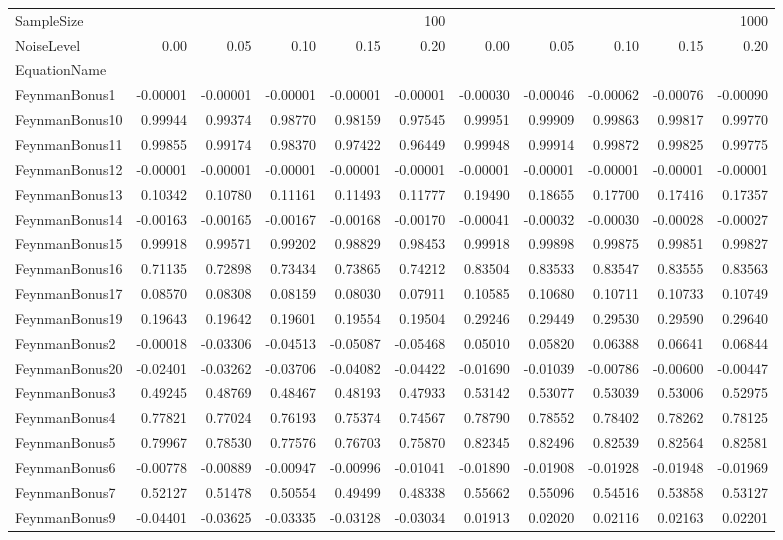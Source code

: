 \begin{tabular}{lrrrrrrrrrr}
\toprule
SampleSize & \multicolumn{5}{r}{100} & \multicolumn{5}{r}{1000} \\
NoiseLevel & 0.00 & 0.05 & 0.10 & 0.15 & 0.20 & 0.00 & 0.05 & 0.10 & 0.15 & 0.20 \\
EquationName &  &  &  &  &  &  &  &  &  &  \\
\midrule
FeynmanBonus1 & -0.00001 & -0.00001 & -0.00001 & -0.00001 & -0.00001 & -0.00030 & -0.00046 & -0.00062 & -0.00076 & -0.00090 \\
FeynmanBonus10 & 0.99944 & 0.99374 & 0.98770 & 0.98159 & 0.97545 & 0.99951 & 0.99909 & 0.99863 & 0.99817 & 0.99770 \\
FeynmanBonus11 & 0.99855 & 0.99174 & 0.98370 & 0.97422 & 0.96449 & 0.99948 & 0.99914 & 0.99872 & 0.99825 & 0.99775 \\
FeynmanBonus12 & -0.00001 & -0.00001 & -0.00001 & -0.00001 & -0.00001 & -0.00001 & -0.00001 & -0.00001 & -0.00001 & -0.00001 \\
FeynmanBonus13 & 0.10342 & 0.10780 & 0.11161 & 0.11493 & 0.11777 & 0.19490 & 0.18655 & 0.17700 & 0.17416 & 0.17357 \\
FeynmanBonus14 & -0.00163 & -0.00165 & -0.00167 & -0.00168 & -0.00170 & -0.00041 & -0.00032 & -0.00030 & -0.00028 & -0.00027 \\
FeynmanBonus15 & 0.99918 & 0.99571 & 0.99202 & 0.98829 & 0.98453 & 0.99918 & 0.99898 & 0.99875 & 0.99851 & 0.99827 \\
FeynmanBonus16 & 0.71135 & 0.72898 & 0.73434 & 0.73865 & 0.74212 & 0.83504 & 0.83533 & 0.83547 & 0.83555 & 0.83563 \\
FeynmanBonus17 & 0.08570 & 0.08308 & 0.08159 & 0.08030 & 0.07911 & 0.10585 & 0.10680 & 0.10711 & 0.10733 & 0.10749 \\
FeynmanBonus19 & 0.19643 & 0.19642 & 0.19601 & 0.19554 & 0.19504 & 0.29246 & 0.29449 & 0.29530 & 0.29590 & 0.29640 \\
FeynmanBonus2 & -0.00018 & -0.03306 & -0.04513 & -0.05087 & -0.05468 & 0.05010 & 0.05820 & 0.06388 & 0.06641 & 0.06844 \\
FeynmanBonus20 & -0.02401 & -0.03262 & -0.03706 & -0.04082 & -0.04422 & -0.01690 & -0.01039 & -0.00786 & -0.00600 & -0.00447 \\
FeynmanBonus3 & 0.49245 & 0.48769 & 0.48467 & 0.48193 & 0.47933 & 0.53142 & 0.53077 & 0.53039 & 0.53006 & 0.52975 \\
FeynmanBonus4 & 0.77821 & 0.77024 & 0.76193 & 0.75374 & 0.74567 & 0.78790 & 0.78552 & 0.78402 & 0.78262 & 0.78125 \\
FeynmanBonus5 & 0.79967 & 0.78530 & 0.77576 & 0.76703 & 0.75870 & 0.82345 & 0.82496 & 0.82539 & 0.82564 & 0.82581 \\
FeynmanBonus6 & -0.00778 & -0.00889 & -0.00947 & -0.00996 & -0.01041 & -0.01890 & -0.01908 & -0.01928 & -0.01948 & -0.01969 \\
FeynmanBonus7 & 0.52127 & 0.51478 & 0.50554 & 0.49499 & 0.48338 & 0.55662 & 0.55096 & 0.54516 & 0.53858 & 0.53127 \\
FeynmanBonus9 & -0.04401 & -0.03625 & -0.03335 & -0.03128 & -0.03034 & 0.01913 & 0.02020 & 0.02116 & 0.02163 & 0.02201 \\
\bottomrule
\end{tabular}
